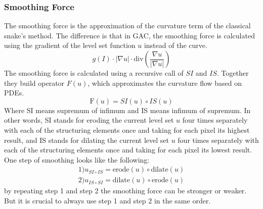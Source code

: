\subsubsection{Smoothing Force}
The smoothing force is the approximation of the curvature term of the classical snake's method. The difference is that in GAC, the smoothing force is calculated using the gradient of the level set function $u$ instead of the curve. 
\begin{equation}
    g(I) \cdot |\nabla u| \cdot \text{div} \left(\frac{\nabla u}{|\nabla u|}\right)
\end{equation}
The smoothing force is calculated using a recursive call of $SI$ and $IS$. Together they build operator $F(u)$, which approximates the curvature flow based on PDEs. 
\begin{equation}
    \text{F}(u) = SI(u)\circ IS (u)
    \label{eq:smoothingforce}
\end{equation}
Where SI means supremum of infimum and IS means infimum of supremum. In other words, SI stands for eroding the current level set $u$ four times separately with each of the structuring elements once and taking for each pixel its highest result, and IS stands for dilating the current level set $u$ four times separately with each of the structuring elements once and taking for each pixel its lowest result. One step of smoothing looks like the following: 
\begin{align*}
    1) u_{SI\circ IS}=\text{erode}(u) \circ \text{dilate}(u) \\
    2) u_{IS\circ SI}=\text{dilate}(u) \circ \text{erode}(u)
\end{align*}
by repeating step 1 and step 2 the smoothing force can be stronger or weaker. But it is crucial to always use step 1 and step 2 in the same order. 


